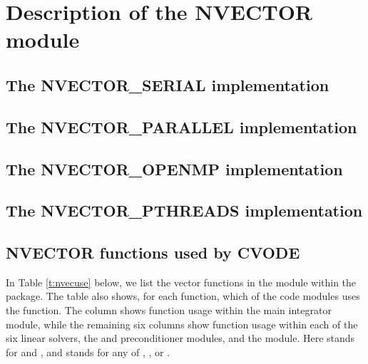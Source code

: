 \chapter{Description of the NVECTOR module}\label{s:nvector}


\section{The NVECTOR\_SERIAL implementation}\label{ss:nvec_ser}


\section{The NVECTOR\_PARALLEL implementation}\label{ss:nvec_par}


\section{The NVECTOR\_OPENMP implementation}\label{ss:nvec_openmp}


\section{The NVECTOR\_PTHREADS implementation}\label{ss:nvec_pthreads}


\section{NVECTOR functions used by CVODE}

In Table \ref{t:nvecuse} below, we list the vector functions in the 
{\nvector} module within the {\cvode} package.
The table also shows, for each function, which of the code modules uses
the function. The {\cvode} column shows function usage within the main
integrator module, while the remaining six columns show function usage
within each of the six {\cvode} linear solvers, the {\cvbandpre} and
{\cvbbdpre} preconditioner modules, and the {\fcvode} module.  Here
{\cvdls} stands for {\cvdense} and {\cvband}, and {\cvspils} stands for any
of {\cvspgmr}, {\cvspbcg}, or {\cvsptfqmr}.

